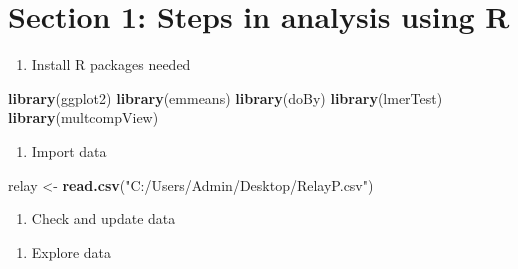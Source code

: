 \documentclass[]{book}
\newenvironment{Shaded}{\begin{snugshade}}{\end{snugshade}}
\newcommand{\KeywordTok}[1]{\textcolor[rgb]{0.13,0.29,0.53}{\textbf{#1}}}
\newcommand{\StringTok}[1]{\textcolor[rgb]{0.31,0.60,0.02}{#1}}
\newcommand{\OperatorTok}[1]{\textcolor[rgb]{0.81,0.36,0.00}{\textbf{#1}}}
\newcommand{\NormalTok}[1]{#1}
\providecommand{\tightlist}{%
  \setlength{\itemsep}{0pt}\setlength{\parskip}{0pt}}
\theoremstyle{definition}
\theoremstyle{definition}
\theoremstyle{definition}
\theoremstyle{remark}
\begin{document}
\section{Section 1: Steps in analysis using
R}\label{section-1-steps-in-analysis-using-r-3}

\begin{enumerate}
\def\labelenumi{\arabic{enumi}.}
\tightlist
\item
  Install R packages needed
\end{enumerate}

\begin{Shaded}
\begin{Highlighting}[]
\KeywordTok{library}\NormalTok{(ggplot2)}
\KeywordTok{library}\NormalTok{(emmeans)}
\KeywordTok{library}\NormalTok{(doBy)}
\KeywordTok{library}\NormalTok{(lmerTest)}
\KeywordTok{library}\NormalTok{(multcompView)}
\end{Highlighting}
\end{Shaded}

\begin{enumerate}
\def\labelenumi{\arabic{enumi}.}
\setcounter{enumi}{1}
\tightlist
\item
  Import data
\end{enumerate}

\begin{Shaded}
\begin{Highlighting}[]
\NormalTok{relay <-}\StringTok{ }\KeywordTok{read.csv}\NormalTok{(}\StringTok{"C:/Users/Admin/Desktop/RelayP.csv"}\NormalTok{)}
\end{Highlighting}
\end{Shaded}

\begin{enumerate}
\def\labelenumi{\arabic{enumi}.}
\setcounter{enumi}{2}
\tightlist
\item
  Check and update data
\end{enumerate}

\begin{Shaded}
\end{Shaded}

\begin{enumerate}
\def\labelenumi{\arabic{enumi}.}
\setcounter{enumi}{3}
\tightlist
\item
  Explore data
\end{enumerate}
\end{document}
